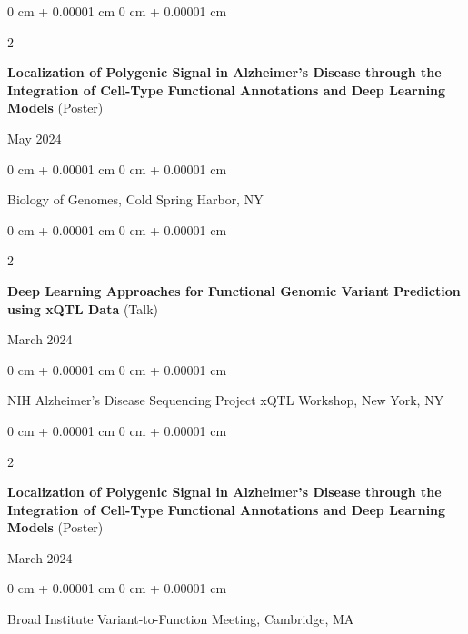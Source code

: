 \documentclass[10pt, letterpaper]{article}
\newenvironment{onecolentry}{
    \begin{adjustwidth}{
        0 cm + 0.00001 cm
    }{
        0 cm + 0.00001 cm
    }
}{
    \end{adjustwidth}
} %
\newenvironment{twocolentry}[2][]{
    \onecolentry
    \def\secondColumn{#2}
    \setcolumnwidth{\fill, 4.5 cm}
    \begin{paracol}{2}
}{
    \switchcolumn \raggedleft \secondColumn
    \end{paracol}
    \endonecolentry
} %
\begin{document}
    \vspace{0.20 cm}

    \begin{samepage}
        \begin{twocolentry}{
            May 2024
        }
            \textbf{Localization of Polygenic Signal in Alzheimer's Disease through the Integration of Cell-Type Functional Annotations and Deep Learning Models} (Poster)
        \end{twocolentry}

        \vspace{0.10 cm}

        \begin{onecolentry}
            Biology of Genomes, Cold Spring Harbor, NY
        \end{onecolentry}
    \end{samepage}

    \vspace{0.20 cm}

    \begin{samepage}
        \begin{twocolentry}{
            March 2024
        }
            \textbf{Deep Learning Approaches for Functional Genomic Variant Prediction using xQTL Data} (Talk)
        \end{twocolentry}

        \vspace{0.10 cm}

        \begin{onecolentry}
            NIH Alzheimer's Disease Sequencing Project xQTL Workshop, New York, NY
        \end{onecolentry}
    \end{samepage}

    \vspace{0.20 cm}

    \begin{samepage}
        \begin{twocolentry}{
            March 2024
        }
            \textbf{Localization of Polygenic Signal in Alzheimer's Disease through the Integration of Cell-Type Functional Annotations and Deep Learning Models} (Poster)
        \end{twocolentry}

        \vspace{0.10 cm}

        \begin{onecolentry}
            Broad Institute Variant-to-Function Meeting, Cambridge, MA
        \end{onecolentry}
    \end{samepage}
\end{document}
